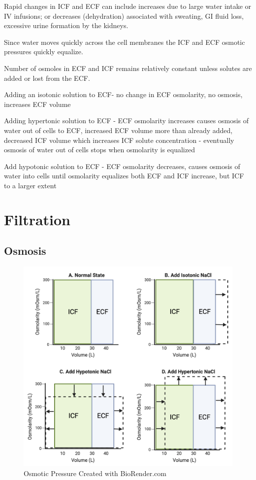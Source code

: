 Rapid changes in ICF and ECF can include increases due to large water intake or IV infusions; or decreases (dehydration) associated with sweating, GI fluid loss, excessive urine formation by the kidneys.

Since water moves quickly across the cell membranes the ICF and ECF osmotic pressures quickly equalize. 

Number of osmoles in ECF and ICF remains relatively constant unless solutes are added or lost from the ECF. 

Adding an isotonic solution to ECF- no change in ECF osmolarity, no osmosis, increases ECF volume

Adding hypertonic solution to ECF - ECF osmolarity increases causes osmosis of water out of cells to ECF, increased ECF volume more than already added, decreased ICF volume which increases ICF solute concentration - eventually osmosis of water out of cells stops when osmolarity is equalized

Add hypotonic solution to ECF - ECF osmolarity decreases, causes osmosis of water into cells until osmolarity equalizes both ECF and ICF increase, but ICF to a larger extent



\section{Filtration}
\subsection{Osmosis}

\begin{figure}[!h]
    \centering
    \includegraphics[width=1\linewidth]{./figure/iso_hypo_hypertonic.png}
    \caption{Osmotic Pressure \footnotesize{Created with BioRender.com}}
    \label{fig:iso_hypo_hypertonic}
\end{figure}


